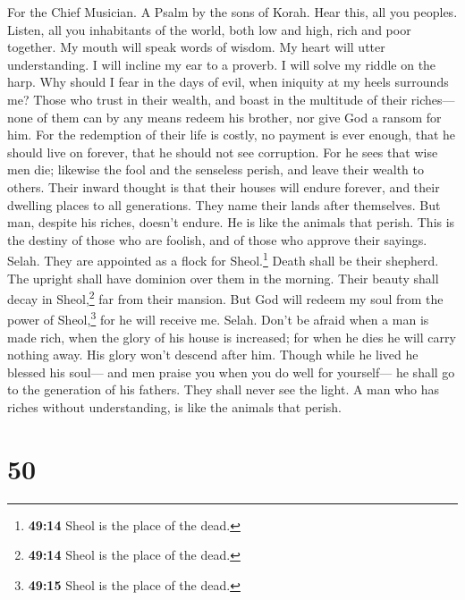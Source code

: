 For the Chief Musician. A Psalm by the sons of Korah. 
Hear this, all you peoples. Listen, all you inhabitants of the world,
 both low and high, rich and poor together. 
My mouth will speak words of wisdom. My heart will utter understanding.
 I will incline my ear to a proverb. I will solve my
riddle on the harp.  Why should I fear in the days of
evil, when iniquity at my heels surrounds me?  Those who
trust in their wealth, and boast in the multitude of their riches---
 none of them can by any means redeem his brother, nor
give God a ransom for him.  For the redemption of their
life is costly, no payment is ever enough,  that he should
live on forever, that he should not see corruption.  For
he sees that wise men die; likewise the fool and the senseless perish,
and leave their wealth to others.  Their inward thought
is that their houses will endure forever, and their dwelling places to
all generations. They name their lands after themselves. 
But man, despite his riches, doesn't endure. He is like the animals that
perish.  This is the destiny of those who are foolish,
and of those who approve their sayings. Selah.  They are
appointed as a flock for Sheol.\footnote{\textbf{49:14} Sheol is the
  place of the dead.} Death shall be their shepherd. The upright shall
have dominion over them in the morning. Their beauty shall decay in
Sheol,\footnote{\textbf{49:14} Sheol is the place of the dead.} far from
their mansion.  But God will redeem my soul from the
power of Sheol,\footnote{\textbf{49:15} Sheol is the place of the dead.}
for he will receive me. Selah.  Don't be afraid when a
man is made rich, when the glory of his house is increased;
 for when he dies he will carry nothing away. His glory
won't descend after him.  Though while he lived he
blessed his soul--- and men praise you when you do well for yourself---
 he shall go to the generation of his fathers. They shall
never see the light.  A man who has riches without
understanding, is like the animals that perish.

\hypertarget{section-49}{%
\section{50}\label{section-49}}

